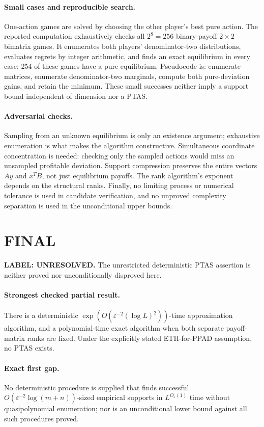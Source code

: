 \documentclass[11pt,a4paper]{article}
\theoremstyle{definition}
\theoremstyle{remark}
\begin{document}
\paragraph{Small cases and reproducible search.}
One-action games are solved by choosing the other player's best pure action. The reported computation exhaustively checks all $2^8=256$ binary-payoff $2\times2$ bimatrix games. It enumerates both players' denominator-two distributions, evaluates regrets by integer arithmetic, and finds an exact equilibrium in every case; 254 of these games have a pure equilibrium. Pseudocode is: enumerate matrices, enumerate denominator-two marginals, compute both pure-deviation gains, and retain the minimum. These small successes neither imply a support bound independent of dimension nor a PTAS.

\paragraph{Adversarial checks.}
Sampling from an unknown equilibrium is only an existence argument; exhaustive enumeration is what makes the algorithm constructive. Simultaneous coordinate concentration is needed: checking only the sampled actions would miss an unsampled profitable deviation. Support compression preserves the entire vectors $Ay$ and $x^TB$, not just equilibrium payoffs. The rank algorithm's exponent depends on the structural ranks. Finally, no limiting process or numerical tolerance is used in candidate verification, and no unproved complexity separation is used in the unconditional upper bounds.

\section{FINAL}
\textbf{LABEL: UNRESOLVED.}
The unrestricted deterministic PTAS assertion is neither proved nor unconditionally disproved here.

\paragraph{Strongest checked partial result.}
There is a deterministic $\exp(O(\varepsilon^{-2}(\log L)^2))$-time approximation algorithm, and a polynomial-time exact algorithm when both separate payoff-matrix ranks are fixed. Under the explicitly stated ETH-for-PPAD assumption, no PTAS exists.

\paragraph{Exact first gap.}
No deterministic procedure is supplied that finds successful $O(\varepsilon^{-2}\log(m+n))$-sized empirical supports in $L^{O_\varepsilon(1)}$ time without quasipolynomial enumeration; nor is an unconditional lower bound against all such procedures proved.
\end{document}
